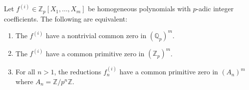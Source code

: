 Let $f^{(i)} \in \mathbb{Z}_p[X_1, \ldots, X_m]$ be homogeneous polynomials with $p$-adic integer coefficients. The following are equivalent:
\begin{enumerate}
\item[(a)] The $f^{(i)}$ have a nontrivial common zero in $(\mathbb{Q}_p)^m$.
\item[(b)] The $f^{(i)}$ have a common primitive zero in $(\mathbb{Z}_p)^m$.
\item[(c)] For all $n > 1$, the reductions $f_n^{(i)}$ have a common primitive zero in $(A_n)^m$ where $A_n = \mathbb{Z}/p^n\mathbb{Z}$.
\end{enumerate}
